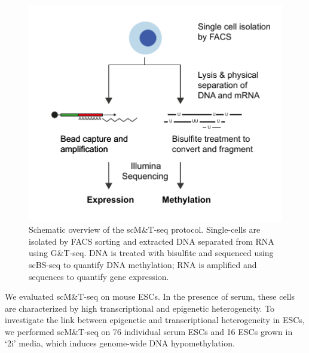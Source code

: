 \begin{figure}[htbp!]
  \begin{minipage}[c]{0.65\textwidth}
    \centering
    \includegraphics[width=1.0\textwidth]{proto}
  \end{minipage}
  \begin{minipage}[c]{0.32\textwidth}
    \caption[Schematic overview of the scM\&T-seq protocol.]{Schematic overview of the scM\&T-seq protocol. Single-cells are isolated by FACS sorting and extracted DNA separated from RNA using G\&T-seq. DNA is treated with bisulfite and sequenced using scBS-seq to quantify DNA methylation; RNA is amplified and sequences to quantify gene expression.}
    \label{fig:mt_proto}
  \end{minipage}
\end{figure}

We evaluated scM\&T-seq on mouse ESCs. In the presence of serum, these cells are characterized by high transcriptional and epigenetic heterogeneity. To investigate the link between epigenetic and transcriptional heterogeneity in ESCs, we performed scM\&T-seq on 76 individual serum ESCs and 16 ESCs grown in `2i' media, which induces genome-wide DNA hypomethylation.

